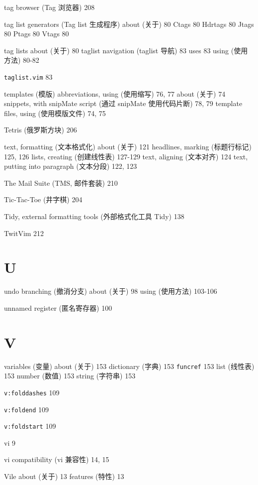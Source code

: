 tag browser (Tag 浏览器) 208

tag list generators (Tag list 生成程序)
  about (关于) 80
  Ctags 80
  Hdrtags 80
  Jtags 80
  Ptags 80
  Vtags 80

tag lists
  about (关于) 80
  taglist navigation (taglist 导航) 83
  uses 83
  using (使用方法) 80-82

\texttt{taglist.vim} 83

templates (模版)
  abbreviations, using (使用缩写) 76, 77
  about (关于) 74
  snippets, with snipMate script (通过 snipMate 使用代码片断) 78, 79
  template files, using (使用模版文件) 74, 75

Tetris (俄罗斯方块) 206

text, formatting (文本格式化)
  about (关于) 121
  headlines, marking (标题行标记) 125, 126
  lists, creating (创建线性表) 127-129
  text, aligning (文本对齐) 124
  text, putting into paragraph (文本分段) 122, 123

The Mail Suite (TMS, 邮件套装) 210

Tic-Tac-Toe (井字棋) 204

Tidy, external formatting tools (外部格式化工具 Tidy) 138

TwitVim 212

\section{U}

undo branching (撤消分支)
  about (关于) 98
  using (使用方法) 103-106

unnamed register (匿名寄存器) 100

\section{V}

variables (变量)
  about (关于) 153
  dictionary (字典) 153
  \texttt{funcref} 153
  list (线性表) 153
  number (数值) 153
  string (字符串) 153

\texttt{v:folddashes} 109

\texttt{v:foldend} 109

\texttt{v:foldstart} 109

vi 9

vi compatibility (vi 兼容性) 14, 15

Vile
  about (关于) 13
  features (特性) 13

